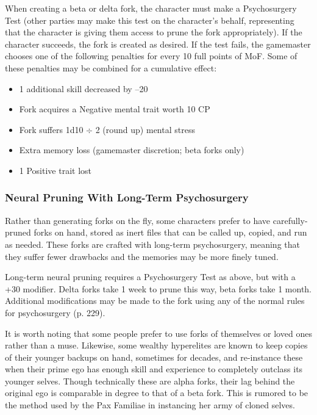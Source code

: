 When creating a beta or delta fork, the character 
must make a Psychosurgery Test (other parties may 
make this test on the character's behalf, representing 
that the character is giving them access to prune the 
fork appropriately). If the character succeeds, the fork 
is created as desired. If the test fails, the gamemaster 
chooses one of the following penalties for every 10 
full points of MoF. Some of these penalties may be 
combined for a cumulative effect:

\begin{itemize}
\item 1 additional skill decreased by –20
\item Fork acquires a Negative mental trait worth 10 CP
\item Fork suffers 1d10 $\div$ 2 (round up) mental stress
\item Extra memory loss (gamemaster discretion; beta forks only)
\item 1 Positive trait lost
\end{itemize}

\subsubsection{Neural Pruning With Long-Term Psychosurgery}

Rather than generating forks on the fly, some characters
prefer to have carefully-pruned forks on hand,
stored as inert files that can be called up, copied, and 
run as needed. These forks are crafted with long-term 
psychosurgery, meaning that they suffer fewer drawbacks
and the memories may be more finely tuned.

Long-term neural pruning requires a Psychosurgery 
Test as above, but with a +30 modifier. Delta forks take 
1 week to prune this way, beta forks take 1 month. Additional
modifications may be made to the fork using
any of the normal rules for psychosurgery (p. 229).

It is worth noting that some people prefer to use 
forks of themselves or loved ones rather than a muse. 
Likewise, some wealthy hyperelites are known to keep 
copies of their younger backups on hand, sometimes 
for decades, and re-instance these when their prime 
ego has enough skill and experience to completely 
outclass its younger selves. Though technically these 
are alpha forks, their lag behind the original ego is 
comparable in degree to that of a beta fork. This is 
rumored to be the method used by the Pax Familiae 
in instancing her army of cloned selves.

